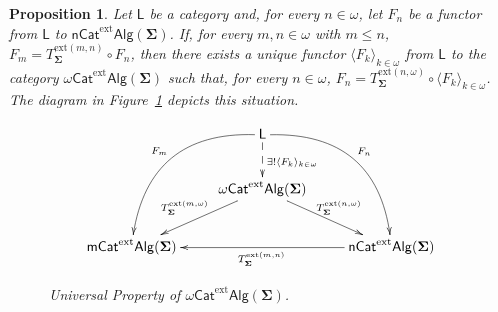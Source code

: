 \documentclass{amsart}
\theoremstyle{plain}
\newtheorem{proposition}[theorem]{Proposition}
\theoremstyle{definition}
\begin{document}
\begin{proposition}\label{PUnivPropExtCatAlg}
	Let $\mathsf{L}$ be a category and, for every $n\in\omega$, let $F_{n}$ be a functor from $\mathsf{L}$ to $\mathsf{nCat}^{\mathrm{ext}}\mathsf{Alg}(\mathbf{\Sigma})$. If, for every $m,n\in\omega$ with $m\leq n$, $F_{m} = T^{\mathrm{ext}(m,n)}_{\mathbf{\Sigma}} \circ F_{n}$, then there exists a unique functor $\langle F_{k}\rangle_{k\in\omega}$ from $\mathsf{L}$ to the category $\omega\mathsf{Cat}^{\mathrm{ext}}\mathsf{Alg}(\mathbf{\Sigma})$ such that, for every $n\in\omega$, $F_{n} = T^{\mathrm{ext}(n,\omega)}_{\mathbf{\Sigma}} \circ \langle F_{k}\rangle_{k\in\omega}$. The diagram in Figure~\ref{FUnivPropExtCatAlg} depicts this situation.
	\begin{figure}
		\[
		\xymatrix{
			& \mathsf{L}\ar@{-->}[d]^{\exists!\langle F_{k}\rangle_{k\in\omega}}\ar@/_30pt/[ddl]_{F_{m}}\ar@/^30pt/[ddr]^{F_{n}} &
			\\
			& \omega\mathsf{Cat}^{\mathrm{ext}}\mathsf{Alg}(\mathbf{\Sigma})\ar[dr]^{T^{\mathrm{ext}(n,\omega)}_{\mathbf{\Sigma}}}\ar[dl]_{T^{\mathrm{ext}(m,\omega)}_{\mathbf{\Sigma}}} &
			\\
			\mathsf{mCat}^{\mathrm{ext}}\mathsf{Alg}(\mathbf{\Sigma}) && \mathsf{nCat}^{\mathrm{ext}}\mathsf{Alg}(\mathbf{\Sigma})\ar[ll]^{T^{\mathrm{ext}(m,n)}_{\mathbf{\Sigma}}}
		}
		\]
		\caption{Universal Property of $\omega\mathsf{Cat}^{\mathrm{ext}}\mathsf{Alg}(\mathbf{\Sigma})$.}
		\label{FUnivPropExtCatAlg}
	\end{figure}
\end{proposition}
\end{document}
